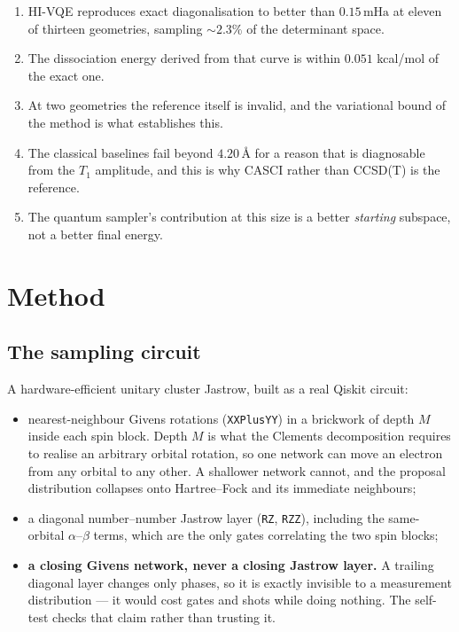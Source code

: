 \documentclass[11pt,a4paper]{article}
\newcommand{\mHa}{\ensuremath{\,\mathrm{mHa}}}
\newcommand{\Ang}{\ensuremath{\,\text{\AA}}}
\newcommand{\code}[1]{\texttt{\small #1}}
\begin{document}
\begin{enumerate}[leftmargin=1.4em,itemsep=0.15em]
\item HI-VQE reproduces exact diagonalisation to better than $0.15\mHa$ at
  eleven of thirteen geometries, sampling ${\sim}2.3\%$ of the determinant
  space.
\item The dissociation energy derived from that curve is within $0.051$
  kcal/mol of the exact one.
\item At two geometries the reference itself is invalid, and the variational
  bound of the method is what establishes this.
\item The classical baselines fail beyond $4.20\Ang$ for a reason that is
  diagnosable from the $T_1$ amplitude, and this is why CASCI rather than
  CCSD(T) is the reference.
\item The quantum sampler's contribution at this size is a better \emph{starting}
  subspace, not a better final energy.
\end{enumerate}

\section{Method}

\subsection{The sampling circuit}

A hardware-efficient unitary cluster Jastrow, built as a real Qiskit circuit:

\begin{itemize}[leftmargin=1.4em,itemsep=0.15em]
\item nearest-neighbour Givens rotations (\code{XXPlusYY}) in a brickwork of
  depth $M$ inside each spin block. Depth $M$ is what the Clements decomposition
  requires to realise an arbitrary orbital rotation, so one network can move an
  electron from any orbital to any other. A shallower network cannot, and the
  proposal distribution collapses onto Hartree--Fock and its immediate
  neighbours;
\item a diagonal number--number Jastrow layer (\code{RZ}, \code{RZZ}), including
  the same-orbital $\alpha$--$\beta$ terms, which are the only gates correlating
  the two spin blocks;
\item \textbf{a closing Givens network, never a closing Jastrow layer.} A
  trailing diagonal layer changes only phases, so it is exactly invisible to a
  measurement distribution --- it would cost gates and shots while doing
  nothing. The self-test checks that claim rather than trusting it.
\end{itemize}
\end{document}
